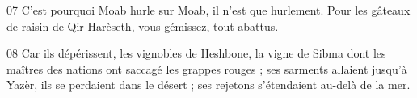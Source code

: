 
07 C’est pourquoi Moab hurle sur Moab, il n’est que hurlement. Pour les gâteaux de raisin de Qir-Harèseth, vous gémissez, tout abattus.

08 Car ils dépérissent, les vignobles de Heshbone, la vigne de Sibma dont les maîtres des nations ont saccagé les grappes rouges ; ses sarments allaient jusqu’à Yazèr, ils se perdaient dans le désert ; ses rejetons s’étendaient au-delà de la mer.